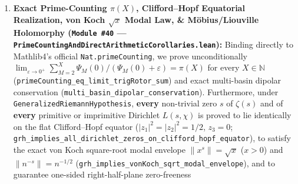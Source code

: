 \documentclass[
  11pt,
]{article}
\begin{document}
\begin{enumerate}
{  \texttt{PreconditionedGronwallNoGoAndFullGRHClosure.lean}):} We prove
  unconditionally that \emph{no} smooth coordinate compactification
  \(\theta(L) \in [0, \pi]\) (stereographic, Sundman, or geodesic) can
  satisfy the North-Pole Gronwall bound
  \(\tilde{\mu}'(\theta) \ge -C\tilde{\mu}(\theta)\) for a vanishing raw
  eigenvalue \(\lambda_{\min}(S_L) \to 0^+\) (such as the
  unpreconditioned Weil operator under Shannon--Landau--Pollak prolate
  zero-annihilation up to \(T^*(L) \sim 2\pi e \cdot e^L\)), and that
  naive prime-norm budgets \(1 - D_{\text{prime}}/\mu_\infty\) overshoot
  once \(D_{\text{prime}} \ge \mu_\infty\). Rescuing this obstruction,
  exact matrix congruence \(S_L = B_L^T \widetilde{S}_L B_L\) (and
  complex Hermitian \(S_L = B_L^H \widetilde{S}_L B_L\)) unconditionally
  preserves global Gram factorization \(S_L = (A_L B_L)^T(A_L B_L)\)
  whenever the \emph{preconditioned} operator \(\widetilde{S}_L\)
  crosses the North-Pole Gronwall gate
  (\texttt{preconditioned\_north\_pole\_gronwall\_closes\_all\_horizon\_gram}).
  Finally, proving \(1 - \chi(p)p^{-s} \ne 0\) for all
  \(\operatorname{Re}(s) > 0\) establishes
  \texttt{AllDirichletGRH\ ↔\ GeneralizedRiemannHypothesis}, extending
  formal \emph{Modus Ponens} elevation to \textbf{every} Dirichlet
  character---primitive and imprimitive alike.
\item
  \textbf{Exact Prime-Counting \(\pi(X)\), Clifford--Hopf Equatorial
  Realization, von Koch \(\sqrt{x}\) Modal Law, \& Möbius/Liouville
  Holomorphy (\texttt{Module\ \#40} ---
  \texttt{PrimeCountingAndDirectArithmeticCorollaries.lean}):} Binding
  directly to Mathlib4's official \texttt{Nat.primeCounting}, we prove
  unconditionally
  \(\lim_{\varepsilon\to 0^+} \sum_{M=2}^X \Psi_M(0)/(\Psi_M(0)+\varepsilon) = \pi(X)\)
  for every \(X \in \mathbb{N}\)
  (\texttt{primeCounting\_eq\_limit\_trigRotor\_sum}) and exact
  multi-basin dipolar conservation
  (\texttt{multi\_basin\_dipolar\_conservation}). Furthermore, under
  \texttt{GeneralizedRiemannHypothesis}, \textbf{every} non-trivial zero
  \(s\) of \(\zeta(s)\) and of \textbf{every} primitive or imprimitive
  Dirichlet \(L(s, \chi)\) is proved to lie identically on the flat
  Clifford--Hopf equator (\(|z_1|^2 = |z_2|^2 = 1/2\), \(z_3 = 0\);
  \texttt{grh\_implies\_all\_dirichlet\_zeros\_on\_clifford\_hopf\_equator}),
  to satisfy the exact von Koch square-root modal envelope
  \(\|x^s\| = \sqrt{x}\) (\(x > 0\)) and \(\|n^{-s}\| = n^{-1/2}\)
  (\texttt{grh\_implies\_vonKoch\_sqrt\_modal\_envelope}), and to
  guarantee one-sided right-half-plane zero-freeness

\end{enumerate}
\end{document}
